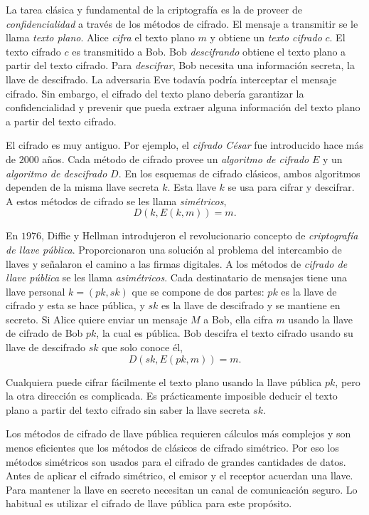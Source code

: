 \documentclass[12pt]{book}
\theoremstyle{definition}
\begin{document}
La tarea clásica y fundamental de la criptografía es la de proveer de \textit{confidencialidad} a través de los métodos de cifrado. El mensaje a transmitir se le llama \textit{texto plano}. Alice \textit{cifra} el texto plano $m$ y obtiene un \textit{texto cifrado} $c$. El texto cifrado $c$ es transmitido a Bob. Bob \textit{descifrando} obtiene el texto plano a partir del texto cifrado. Para \textit{descifrar}, Bob necesita una información secreta, la llave de descifrado. La adversaria Eve todavía podría interceptar el mensaje cifrado. Sin embargo, el cifrado del texto plano debería garantizar la confidencialidad y prevenir que pueda extraer alguna información del texto plano a partir del texto cifrado.

El cifrado es muy antiguo. Por ejemplo, el \textit{cifrado César} fue introducido hace más de $2000$ años. Cada método de cifrado provee un \textit{algoritmo de cifrado} $E$ y un \textit{algoritmo de descifrado} $D$. En los esquemas de cifrado clásicos, ambos algoritmos dependen de la misma llave secreta $k$. Esta llave $k$ se usa para cifrar y descifrar. A estos métodos de cifrado se les llama \textit{simétricos},
$$D(k,E(k,m))=m.$$

En $1976$, Diffie y Hellman introdujeron el revolucionario concepto de \textit{criptografía de llave pública}. Proporcionaron una solución al problema del intercambio de llaves y señalaron el camino a las firmas digitales. A los métodos de \textit{cifrado de llave pública} se les llama \textit{asimétricos}. Cada destinatario de mensajes tiene una llave personal $k = (pk,sk)$ que se compone de dos partes: $pk$ es la llave de cifrado y esta se hace pública, y $sk$ es la llave de descifrado y se mantiene en secreto. Si Alice quiere enviar un mensaje $M$ a Bob, ella cifra $m$ usando la llave de cifrado de Bob $pk$, la cual es pública. Bob descifra el texto cifrado usando su llave de descifrado $sk$ que solo conoce él,
$$D(sk,E(pk,m))=m.$$

Cualquiera puede cifrar fácilmente el texto plano usando la llave pública $pk$, pero la otra dirección es complicada. Es prácticamente imposible deducir el texto plano a partir del texto cifrado sin saber la llave secreta $sk$.

Los métodos de cifrado de llave pública requieren cálculos más complejos y son menos eficientes que los métodos de clásicos de cifrado simétrico. Por eso los métodos simétricos son usados para el cifrado de grandes cantidades de datos. Antes de aplicar el cifrado simétrico, el emisor y el receptor acuerdan una llave. Para mantener la llave en secreto necesitan un canal de comunicación seguro. Lo habitual es utilizar el cifrado de llave pública para este propósito.
\end{document}
